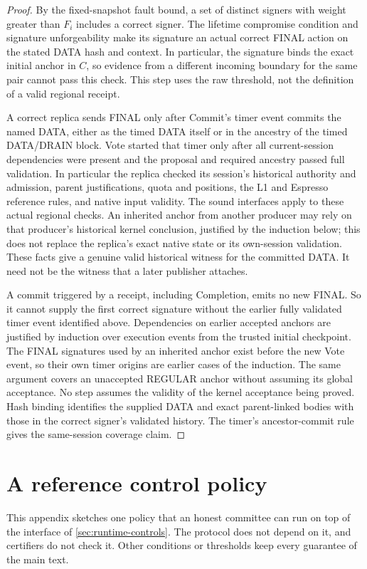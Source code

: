 \documentclass[11pt,a4paper]{article}
\newcounter{protocol}
\begin{document}
\begin{proof}
By the fixed-snapshot fault bound, a set of distinct signers with weight
greater than $F_i$ includes a correct signer. The lifetime compromise
condition and signature unforgeability make its signature an actual
correct FINAL action on the stated DATA hash and context. In particular,
the signature binds the exact initial anchor in $C$, so evidence from a
different incoming boundary for the same pair cannot pass this check.
This step uses the raw threshold, not the definition of a valid regional
receipt.

A correct replica sends FINAL only after Commit's timer event commits the
named DATA, either as the timed DATA itself or in the ancestry of the
timed DATA/DRAIN block. Vote started that timer only after all
current-session dependencies were present and the proposal and required
ancestry passed full validation. In particular the replica checked its
session's historical authority and admission, parent justifications,
quota and positions, the L1 and Espresso reference rules, and native
input validity. The sound interfaces apply to these actual regional
checks. An inherited anchor from another producer may rely on that
producer's historical kernel conclusion, justified by the induction
below; this does not replace the replica's exact native state or its
own-session validation. These facts give a genuine valid historical
witness for the committed DATA. It need not be the witness that a later
publisher attaches.

A commit triggered by a receipt, including Completion, emits no new
FINAL. So it cannot supply the first correct signature without the
earlier fully validated timer event identified above. Dependencies on
earlier accepted anchors are justified by induction over execution
events from the trusted initial checkpoint. The FINAL signatures used by
an inherited anchor exist before the new Vote event, so their own timer
origins are earlier cases of the induction. The same argument covers an
unaccepted REGULAR anchor without assuming its global acceptance. No step
assumes the validity of the kernel acceptance being proved. Hash binding
identifies the supplied DATA and exact parent-linked bodies with those in
the correct signer's validated history. The timer's ancestor-commit rule
gives the same-session coverage claim.
\end{proof}

\section{A reference control policy}
\label{app:policy}
This appendix sketches one policy that an honest committee can run on
top of the interface of \cref{sec:runtime-controls}. The protocol does
not depend on it, and certifiers do not check it. Other conditions or
thresholds keep every guarantee of the main text.
\end{document}
